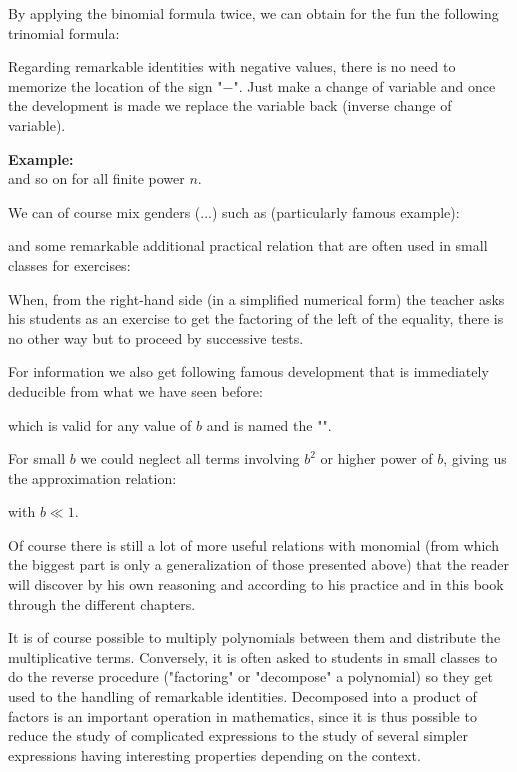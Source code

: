 	By applying the binomial formula twice, we can obtain for the fun the following trinomial formula:
	
	
	Regarding remarkable identities with negative values, there is no need to memorize the location of the sign "$-$". Just make a change of variable and once the development is made we replace the variable back (inverse change of variable).
	\begin{tcolorbox}[colframe=black,colback=white,sharp corners]
	\textbf{{\Large {}}Example:}\\
	
	and so on for all finite power $n$.
	\end{tcolorbox}
	We can of course mix genders (...) such as (particularly famous example):
	
	and some remarkable additional practical relation that are often used in small classes for exercises:
	
	\begin{tcolorbox}[title=Remark,colframe=black,arc=10pt]
	When, from the right-hand side (in a simplified numerical form) the teacher asks his students as an exercise to get the factoring of the left of the equality, there is no other way but to proceed by successive tests.
	\end{tcolorbox}
	For information we also get following famous development that is immediately deducible from what we have seen before:
	
	which is valid for any value of $b$ and is named the "\label{binomial expansion}". 
	
	For small $b$ we could neglect all terms involving $b^2$ or higher power of $b$, giving us the approximation relation:
	
	with $b\ll 1$.
	
	Of course there is still a lot of more useful relations with monomial (from which the biggest part is only a generalization of those presented above) that the reader will discover by his own reasoning and according to his practice and in this book through the different chapters.
	\begin{tcolorbox}[title=Remark,colframe=black,arc=10pt]
	It is of course possible to multiply polynomials between them and distribute the multiplicative terms. Conversely, it is often asked to students in small classes to do the reverse procedure ("factoring" or "decompose" a polynomial) so they get used to the handling of remarkable identities. Decomposed into a product of factors is an important operation in mathematics, since it is thus possible to reduce the study of complicated expressions to the study of several simpler expressions having interesting properties depending on the context.
	\end{tcolorbox}
	
